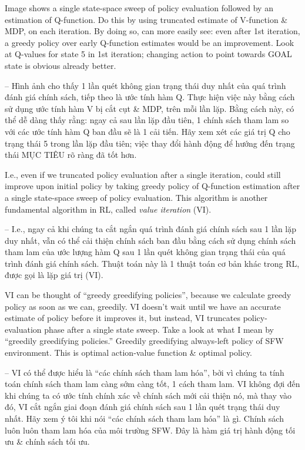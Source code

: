 \documentclass{article}
\begin{document}
\begin{itemize}
\begin{itemize}
\begin{itemize}
            Image shows a single state-space sweep of policy evaluation followed by an estimation of Q-function. Do this by using truncated estimate of V-function \& MDP, on each iteration. By doing so, can more easily see: even after 1st iteration, a greedy policy over early Q-function estimates would be an improvement. Look at Q-values for state 5 in 1st iteration; changing action to point towards GOAL state is obvious already better.

            -- Hình ảnh cho thấy 1 lần quét không gian trạng thái duy nhất của quá trình đánh giá chính sách, tiếp theo là ước tính hàm Q. Thực hiện việc này bằng cách sử dụng ước tính hàm V bị cắt cụt \& MDP, trên mỗi lần lặp. Bằng cách này, có thể dễ dàng thấy rằng: ngay cả sau lần lặp đầu tiên, 1 chính sách tham lam so với các ước tính hàm Q ban đầu sẽ là 1 cải tiến. Hãy xem xét các giá trị Q cho trạng thái 5 trong lần lặp đầu tiên; việc thay đổi hành động để hướng đến trạng thái MỤC TIÊU rõ ràng đã tốt hơn.

            I.e., even if we truncated policy evaluation after a single iteration, could still improve upon initial policy by taking greedy policy of Q-function estimation after a single state-space sweep of policy evaluation. This algorithm is another fundamental algorithm in RL, called {\it value iteration} (VI).

            -- I.e., ngay cả khi chúng ta cắt ngắn quá trình đánh giá chính sách sau 1 lần lặp duy nhất, vẫn có thể cải thiện chính sách ban đầu bằng cách sử dụng chính sách tham lam của ước lượng hàm Q sau 1 lần quét không gian trạng thái của quá trình đánh giá chính sách. Thuật toán này là 1 thuật toán cơ bản khác trong RL, được gọi là lặp giá trị (VI).

            VI can be thought of ``greedy greedifying policies'', because we calculate greedy policy as soon as we can, greedily. VI doesn't wait until we have an accurate estimate of policy before it improves it, but instead, VI truncates policy-evaluation phase after a single state sweep. Take a look at what I mean by ``greedily greedifying policies.'' {\sf Greedily greedifying always-left policy of SFW environment.} This is optimal action-value function \& optimal policy.

            -- VI có thể được hiểu là ``các chính sách tham lam hóa'', bởi vì chúng ta tính toán chính sách tham lam càng sớm càng tốt, 1 cách tham lam. VI không đợi đến khi chúng ta có ước tính chính xác về chính sách mới cải thiện nó, mà thay vào đó, VI cắt ngắn giai đoạn đánh giá chính sách sau 1 lần quét trạng thái duy nhất. Hãy xem ý tôi khi nói ``các chính sách tham lam hóa'' là gì. {\sf Chính sách luôn luôn tham lam hóa của môi trường SFW.} Đây là hàm giá trị hành động tối ưu \& chính sách tối ưu.


\end{itemize}
\end{itemize}
\end{itemize}
\end{document}
